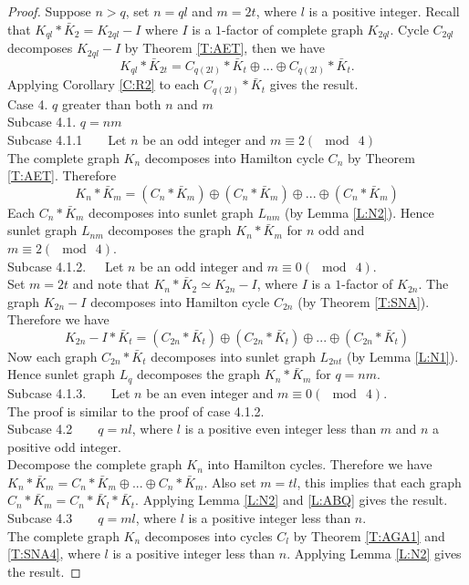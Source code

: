 \documentclass[12pt]{report}
\begin{document}
\begin{proof}
Suppose $n>q$, set $n=ql$ and $m=2t$, where $l$ is a positive
integer. Recall that $K_{ql}*\bar{K}_2=K_{2ql}-I$ where $I$ is a
$1$-factor of complete graph $K_{2ql}$. Cycle $C_{2ql}$ decomposes
$K_{2ql}-I$ by Theorem \ref{T:AET}, then we have
$$K_{ql}*\bar{K}_{2t}=C_{q(2l)}*\bar{K}_t\oplus...\oplus
C_{q(2l)}*\bar{K}_t.$$ Applying Corollary \ref{C:R2} to each $C_{q(2l)}*\bar{K}_t$ gives the result.
\\
Case 4. $q$ greater than both $n$ and $m$\\
Subcase 4.1.    $q=nm$\\
Subcase 4.1.1\ \ \ \ Let $n$ be an odd integer and $m\equiv 2(\mod\ 4)$\\
The complete graph $K_n$ decomposes into Hamilton cycle $C_n$ by
Theorem \ref{T:AET}. Therefore $$K_n*\bar{K}_m=(C_n*\bar{K}_m)\oplus
(C_n*\bar{K}_m)\oplus...\oplus (C_n*\bar{K}_m)$$ Each
$C_n*\bar{K}_m$ decomposes into sunlet graph $L_{nm}$ (by Lemma
\ref{L:N2}). Hence sunlet graph $L_{nm}$ decomposes the graph
$K_n*\bar{K}_m$ for $n$ odd and $m\equiv 2(\mod\ 4)$.
\\
Subcase 4.1.2.\ \ \ Let $n$ be an odd integer  and $m\equiv 0(\mod \ 4)$.\\
Set $ m=2t$ and note that $K_n*\bar{K}_2\simeq K_{2n}-I$, where $I$
is a $1$-factor of $K_{2n}$. The graph $K_{2n}-I$ decomposes into
Hamilton cycle $C_{2n}$ (by Theorem \ref{T:SNA}). Therefore we have
$$K_{2n}-I*\bar{K}_t=(C_{2n}*\bar{K}_t)\oplus
(C_{2n}*\bar{K}_t)\oplus...\oplus (C_{2n}*\bar{K}_t)$$ Now each
graph $C_{2n}*\bar{K}_t$ decomposes into sunlet graph $L_{2nt}$ (by
Lemma \ref{L:N1}). Hence sunlet graph $L_q$  decomposes  the graph
$K_n*\bar{K}_m$ for $q=nm$.
\\
Subcase 4.1.3.\ \ \ \ Let $n$ be an even integer and $m\equiv 0(\mod\ 4)$.\\
The proof is similar to the proof of case 4.1.2.\\
Subcase 4.2\ \ \ \ $q=nl$, where $l$ is a positive even integer less
than $m$ and
$n$  a positive odd integer.\\
Decompose the complete graph $K_n$ into
Hamilton cycles. Therefore we have%
$K_n*\bar{K}_m=C_n*\bar{K}_m\oplus...\oplus C_n*\bar{K}_m$. Also set
$m=tl$, this implies that each graph
$C_n*\bar{K}_m=C_n*\bar{K}_l*\bar{K}_t$. Applying Lemma \ref{L:N2}
and \ref{L:ABQ} gives the result.\\
Subcase 4.3\ \ \ \ $q=ml$, where $l$ is a positive integer less than
$n$.\\
The complete graph $K_n$ decomposes into cycles $C_l$ by Theorem
\ref{T:AGA1} and \ref{T:SNA4}, where $l$ is a positive integer less
than $n$. Applying Lemma \ref{L:N2} gives the result.
\end{proof}
\end{document}
